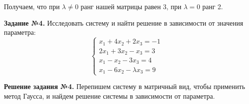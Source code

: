 \documentclass[a4paper, 12pt]{article}
\begin{document}
Получаем, что при $\lambda \ne 0$ ранг нашей матрицы равен $3$, при $\lambda = 0$ ранг 2. 

\newpage

\textbf{Задание №4.} Исследовать систему и найти решение в зависимости от значения параметра:
\[
\begin{cases}
    x_1 + 4x_2 + 2x_3 = -1 \\ 
    2x_1 + 3x_2 - x_3 = 3 \\ 
    x_1 - x_2 - 3x_3 = 4 \\ 
    x_1 - 6x_2 - \lambda x_3 = 9
\end{cases}
\]

\vspace{0.5cm}

\textbf{Решение задания №4.} Перепишем систему в матричный вид, чтобы применить метод Гаусса, и найдем решение системы в зависимости от параметра.
\end{document}
